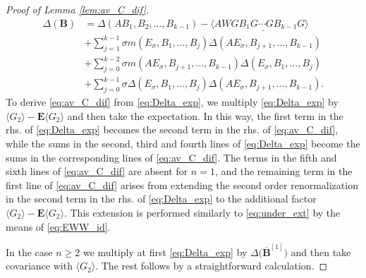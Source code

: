\documentclass[10pt]{amsart}
\numberwithin{equation}{section}
\newcommand{\E}{\mathbf{E}}
\begin{document}
\begin{proof}[Proof of Lemma \ref{lem:av_C_dif}]
\begin{align}
\Delta(\bm{B})&=\Delta(AB_1,B_2,\ldots,B_{k-1})-\langle A\underline{WGB_1G\cdots GB_{k-1}G}\rangle\label{eq:Delta_exp}\\
&+\sum_{j=1}^{k-1} \sigma m(E_\sigma, B_1,\ldots, B_j)\Delta (AE_\sigma, B_{j+1},\ldots, B_{k-1})\nonumber\\
&+\sum_{j=0}^{k-2} \sigma m(AE_\sigma, B_{j+1},\ldots, B_{k-1})\Delta ( E_\sigma, B_1,\ldots, B_j)\nonumber\\
&+ \sum_{j=0}^{k-1} \sigma \Delta(E_\sigma, B_1,\ldots,B_j)\Delta(AE_\sigma,B_{j+1},\ldots,B_{k-1}).\nonumber
\end{align}
To derive \eqref{eq:av_C_dif} from \eqref{eq:Delta_exp}, we multiply \eqref{eq:Delta_exp} by $\langle G_2\rangle -\E\langle G_2\rangle$ and then take the expectation. In this way, the first term in the rhs. of \eqref{eq:Delta_exp} becomes the second term in the rhs. of \eqref{eq:av_C_dif}, while the sums in the second, third and fourth lines of \eqref{eq:Delta_exp} become the sums in the corresponding lines of \eqref{eq:av_C_dif}. The terms in the fifth and sixth lines of \eqref{eq:av_C_dif} are absent for $n=1$, and the remaining term in the first line of \eqref{eq:av_C_dif} arises from extending the second order renormalization in the second term in the rhs. of \eqref{eq:Delta_exp} to the additional factor $\langle G_2\rangle -\E\langle G_2\rangle$. This extension is performed similarly to \eqref{eq:under_ext} by the means of \eqref{eq:EWW_id}. 

In the case $n\ge 2$ we multiply at first \eqref{eq:Delta_exp} by $\Delta\big(\overline{\bm{B}}^{[1]}\big)$ and then take covariance with $\langle G_2\rangle$. The rest follows by a straightforward calculation.
\end{proof}
\end{document}
